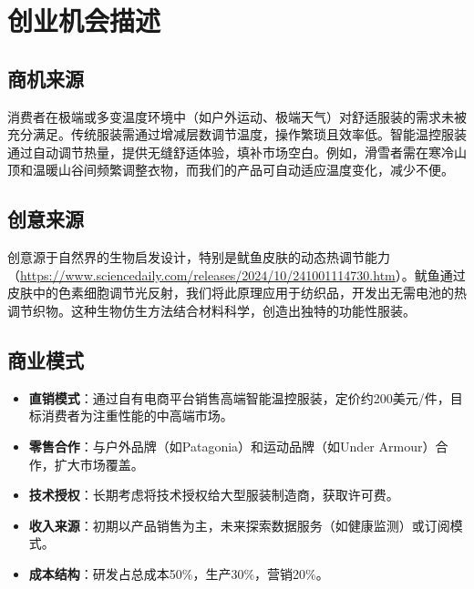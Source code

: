 \documentclass[UTF8]{report}
\theoremstyle{MyLineTheoremStyle} %
\theoremstyle{MyBlockTheoremStyle} %
\theoremstyle{MySubsubsectionStyle} %
\begin{document}

\setcounter{tocdepth}{4}                %
\tableofcontents                        %
\thispagestyle{fancy}                   %

    \newpage    




\newpage
\chapter{创业机会描述}
\section{商机来源}
消费者在极端或多变温度环境中（如户外运动、极端天气）对舒适服装的需求未被充分满足。传统服装需通过增减层数调节温度，操作繁琐且效率低。智能温控服装通过自动调节热量，提供无缝舒适体验，填补市场空白。例如，滑雪者需在寒冷山顶和温暖山谷间频繁调整衣物，而我们的产品可自动适应温度变化，减少不便。

\section{创意来源}
创意源于自然界的生物启发设计，特别是鱿鱼皮肤的动态热调节能力（\url{https://www.sciencedaily.com/releases/2024/10/241001114730.htm}）。鱿鱼通过皮肤中的色素细胞调节光反射，我们将此原理应用于纺织品，开发出无需电池的热调节织物。这种生物仿生方法结合材料科学，创造出独特的功能性服装。

\section{商业模式}
\begin{itemize}
    \item \textbf{直销模式}：通过自有电商平台销售高端智能温控服装，定价约200美元/件，目标消费者为注重性能的中高端市场。
    \item \textbf{零售合作}：与户外品牌（如Patagonia）和运动品牌（如Under Armour）合作，扩大市场覆盖。
    \item \textbf{技术授权}：长期考虑将技术授权给大型服装制造商，获取许可费。
    \item \textbf{收入来源}：初期以产品销售为主，未来探索数据服务（如健康监测）或订阅模式。
    \item \textbf{成本结构}：研发占总成本50\%，生产30\%，营销20\%。
\end{itemize}
\end{document}
